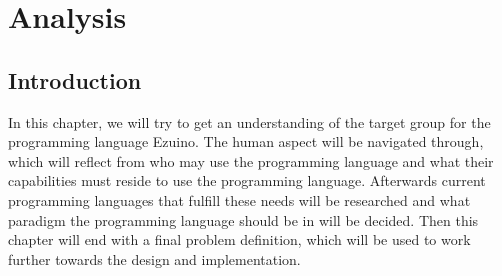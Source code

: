 \chapter{Analysis}\label{ch:ch2label}
\section{Introduction}
In this chapter, we will try to get an understanding of the target group for the programming language Ezuino. The human aspect will be navigated through, which will reflect from who may use the programming language and what their capabilities must reside to use the programming language. Afterwards current programming languages that fulfill these needs will be researched and what paradigm the programming language should be in will be decided. Then this chapter will end with a final problem definition, which will be used to work further towards the design and implementation.